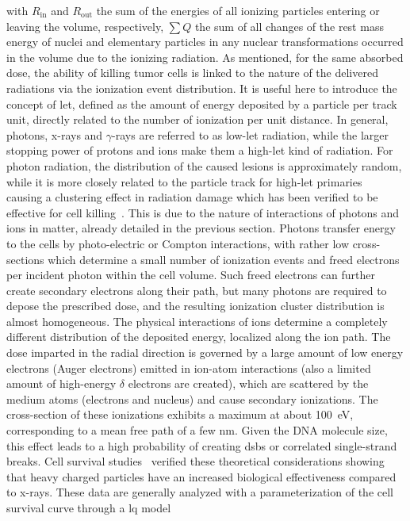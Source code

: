 with $R_{\mathrm{in}}$ and $R_{\mathrm{out}}$ the sum of the energies of all ionizing particles entering or leaving the volume, respectively, $ \sum{Q}$ the sum of all changes of the rest mass energy of nuclei and elementary particles in any nuclear transformations occurred in the volume due to the ionizing radiation.
As mentioned, for the same absorbed dose, the ability of killing tumor cells is linked to the nature of the delivered radiations via the ionization event distribution. It is useful here to introduce the concept of \gls{let}, defined as the amount of energy deposited by a particle per track unit, directly related to the number of ionization per unit distance. In general, photons, x-rays and $\gamma$-rays are referred to as low-\gls{let} radiation, while the larger stopping power of protons and ions make them a high-\gls{let} kind of radiation. For photon radiation, the distribution of the caused lesions is approximately random, while it is more closely related to the particle track for high-\gls{let} primaries~\parencite{Lobrich1996} causing a clustering effect in radiation damage which has been verified to be effective for cell killing~\parencite{Holley1996, Rydberg1996}. This is due to the nature of interactions of photons and ions in matter, already detailed in the previous section. 
Photons transfer energy to the cells by photo-electric or Compton interactions, with rather low cross-sections which determine a small number of ionization events and freed electrons per incident photon within the cell volume. Such freed electrons can further create secondary electrons along their path, but many photons are required to depose the prescribed dose, and the resulting ionization cluster distribution is almost homogeneous. The physical interactions of ions determine a completely different distribution of the deposited energy, localized along the ion path. The dose imparted in the radial direction is governed by a large amount of low energy electrons (Auger electrons) emitted in ion-atom interactions (also a limited amount of high-energy $\delta$ electrons are created), which are scattered by the medium atoms (electrons and nucleus) and cause secondary ionizations. The cross-section of these ionizations exhibits a maximum at about 100~eV, corresponding to a mean free path of a few nm. Given the DNA molecule size, this effect leads to a high probability of creating \glspl{dsb} or correlated single-strand breaks. %
Cell survival studies~\parencite{Tobias1982, Blakely1984} verified these theoretical considerations showing that heavy charged particles have an increased biological effectiveness compared to x-rays. These data are generally analyzed with a parameterization of the cell survival curve through a \gls{lq} model~\parencite{Hall2012}

